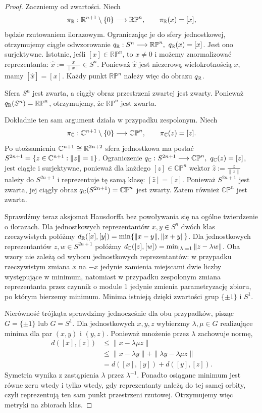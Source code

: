 \begin{proof}
Zaczniemy od zwartości. Niech
\[
\pi_{\mathbb{R}}:\mathbb{R}^{n+1}\setminus\{0\}\longrightarrow\mathbb{RP}^n,
\qquad
\pi_{\mathbb{R}}(x)=[x],
\]
będzie rzutowaniem ilorazowym. Ograniczając je do sfery jednostkowej,
otrzymujemy ciągłe odwzorowanie $q_{\R}:S^n\longrightarrow\mathbb{RP}^n, \ q_{\R}(x)=[x]$.
Jest ono surjektywne. Istotnie, jeśli $[x]\in\mathbb{RP}^n$,
to $x\neq0$ i możemy znormalizować reprezentanta: $\widehat{x}:=\frac{x}{\|x\|}\in S^n$.
Ponieważ $\widehat{x}$ jest niezerową wielokrotnością $x$, mamy $[\widehat{x}]=[x]$.
Każdy punkt $\mathbb{RP}^n$ należy więc do obrazu $q_{\mathbb{R}}$.

Sfera $S^n$ jest zwarta, a ciągły obraz przestrzeni zwartej jest zwarty.
Ponieważ $q_{\mathbb{R}}(S^n)=\mathbb{RP}^n$,
otrzymujemy, że $\mathbb{RP}^n$ jest zwarta.

Dokładnie ten sam argument działa w przypadku zespolonym. Niech
\[
\pi_{\mathbb{C}}:\mathbb{C}^{n+1}\setminus\{0\}\longrightarrow\mathbb{CP}^n,
\qquad
\pi_{\mathbb{C}}(z)=[z].
\]
Po utożsamieniu $\mathbb{C}^{n+1}\cong\mathbb{R}^{2n+2}$ sfera jednostkowa ma postać $S^{2n+1} = \{z\in\mathbb{C}^{n+1}:\|z\|=1\}$.
Ograniczenie $q_{\C}:S^{2n+1}\longrightarrow\mathbb{CP}^n, \ q_{\C}(z)=[z]$,
jest ciągłe i surjektywne, ponieważ dla każdego $[z]\in\mathbb{CP}^n$
wektor $\widehat{z}:=\frac{z}{\|z\|}$
należy do $S^{2n+1}$ i reprezentuje tę samą klasę: $[\widehat{z}]=[z]$.
Ponieważ $S^{2n+1}$ jest zwarta, jej ciągły obraz $q_{\mathbb{C}}(S^{2n+1})=\mathbb{CP}^n$
jest zwarty. Zatem również $\mathbb{CP}^n$ jest zwarta.

Sprawdźmy teraz aksjomat Hausdorffa bez powoływania się na ogólne
twierdzenie o ilorazach. Dla jednostkowych reprezentantów $x,y\in S^n$
dwóch klas rzeczywistych połóżmy $d_{\mathbb{R}}([x],[y]) = \min\{\|x-y\|,\|x+y\|\}$.
Dla jednostkowych reprezentantów $z,w\in S^{2n+1}$ połóżmy $d_{\mathbb{C}}([z],[w]) = \min_{|\lambda|=1}\|z-\lambda w\|$.
Oba wzory nie zależą od wyboru jednostkowych reprezentantów:
w przypadku rzeczywistym zmiana $x$ na $-x$ jedynie zamienia miejscami
dwie liczby występujące w minimum, natomiast w przypadku zespolonym
zmiana reprezentanta przez czynnik o module $1$ jedynie zmienia
parametryzację zbioru, po którym bierzemy minimum. Minima istnieją
dzięki zwartości grup $\{\pm1\}$ i $S^1$.

Nierówność trójkąta sprawdzimy jednocześnie dla obu przypadków,
pisząc $G=\{\pm1\}$ lub $G=S^1$. Dla jednostkowych $x,y,z$
wybierzmy $\lambda,\mu\in G$ realizujące minima dla par $(x,y)$ i $(y,z)$.
Ponieważ mnożenie przez $\lambda$ zachowuje normę,
\begin{align*}
d([x],[z])&\leq\|x-\lambda\mu z\|\\
&\leq\|x-\lambda y\|+\|\lambda y-\lambda\mu z\|\\
&=d([x],[y])+d([y],[z]).
\end{align*}
Symetria wynika z zastąpienia $\lambda$ przez $\lambda^{-1}$.
Ponadto osiągane minimum jest równe zeru wtedy i tylko wtedy,
gdy reprezentanty należą do tej samej orbity, czyli reprezentują
ten sam punkt przestrzeni rzutowej. Otrzymujemy więc metryki na zbiorach klas.


\end{proof}
